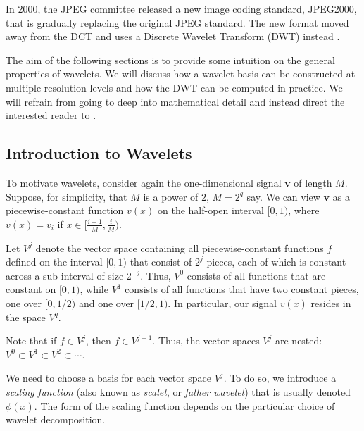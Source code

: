 In 2000, the JPEG committee released a new image coding standard, JPEG2000, that is gradually replacing the original JPEG standard.
The new format moved away from the DCT and uses a Discrete Wavelet Transform (DWT) instead \cite{usevitch2001}.

The aim of the following sections is to provide some intuition on the general properties of wavelets.
We will discuss how a wavelet basis can be constructed at multiple resolution levels and how the DWT can be computed in practice.
We will refrain from going to deep into mathematical detail and instead direct the interested reader to \cite{mallat1999,daubechies1992}.

\subsection{Introduction to Wavelets}
To motivate wavelets, consider again the one-dimensional signal $\bm v$ of length $M$.
Suppose, for simplicity, that $M$ is a power of $2$, $M = 2^q$ say.
We can view $\bm v$ as a piecewise-constant function $v(x)$ on the half-open interval $[0,1)$, where $v(x) = v_i$ if $x \in [\frac{i-1}{M}, \frac{i}{M})$.

Let $V^j$ denote the vector space containing all piecewise-constant functions $f$ defined on the interval $[0,1)$ that consist of $2^j$ pieces, each of which is constant across a sub-interval of size $2^{-j}$.
Thus, $V^0$ consists of all functions that are constant on $[0,1)$, while $V^1$ consists of all functions that have two constant pieces, one over $[0,1/2)$ and one over $[1/2,1)$.
In particular, our signal $v(x)$ resides in the space $V^q$.

Note that if $f \in V^j$, then $f \in V^{j+1}$.
Thus, the vector spaces $V^j$ are nested: $V^0 \subset V^1 \subset V^2 \subset \cdots$.

We need to choose a basis for each vector space $V^j$.
To do so, we introduce a \emph{scaling function} (also known as \emph{scalet}, or \emph{father wavelet}) that is usually denoted $\phi(x)$.
The form of the scaling function depends on the particular choice of wavelet decomposition.

